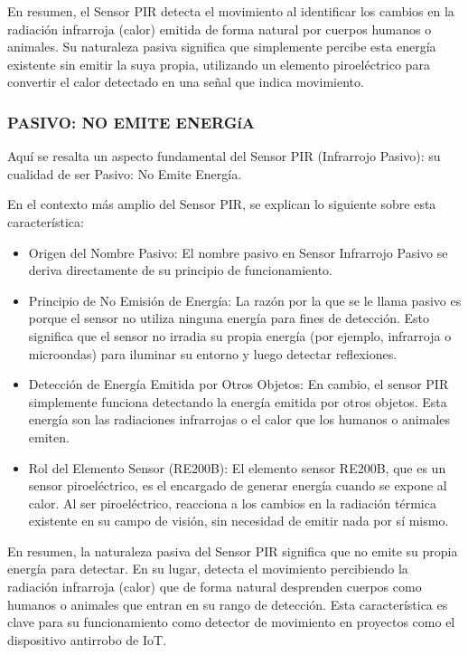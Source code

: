 \documentclass{report}
\begin{document}
En resumen, el Sensor PIR detecta el movimiento al identificar los cambios en la radiación infrarroja (calor) emitida de forma natural por cuerpos humanos 
o animales. Su naturaleza pasiva significa que simplemente percibe esta energía existente sin emitir la suya propia, utilizando un elemento piroeléctrico 
para convertir el calor detectado en una señal que indica movimiento.

\subsubsection{PASIVO: NO EMITE ENERGíA}
Aquí se resalta un aspecto fundamental del Sensor PIR (Infrarrojo Pasivo): su cualidad de ser 
Pasivo: No Emite Energía.

En el contexto más amplio del Sensor PIR, se  explican lo siguiente sobre esta característica:
\begin{itemize}
    \item Origen del Nombre Pasivo: El nombre pasivo en Sensor Infrarrojo Pasivo se deriva directamente de su principio de funcionamiento.
    \item Principio de No Emisión de Energía: La razón por la que se le llama pasivo es porque el sensor no utiliza ninguna energía para fines de detección. 
    Esto significa que el sensor no irradia su propia energía (por ejemplo, infrarroja o microondas) para iluminar su entorno y luego detectar reflexiones.
    \item Detección de Energía Emitida por Otros Objetos: En cambio, el sensor PIR simplemente funciona detectando la energía emitida por otros objetos. 
    Esta energía son las radiaciones infrarrojas o el calor que los humanos o animales emiten.
    \item Rol del Elemento Sensor (RE200B): El elemento sensor RE200B, que es un sensor piroeléctrico, es el encargado de generar energía cuando se expone 
    al calor. Al ser piroeléctrico, reacciona a los cambios en la radiación térmica existente en su campo de visión, sin necesidad de emitir nada por sí mismo. 
\end{itemize}

En resumen, la naturaleza pasiva del Sensor PIR significa que no emite su propia energía para detectar. En su lugar, detecta el movimiento percibiendo 
la radiación infrarroja (calor) que de forma natural desprenden cuerpos como humanos o animales que entran en su rango de detección. 
Esta característica es clave para su funcionamiento como detector de movimiento en proyectos como el dispositivo antirrobo de IoT.
\end{document}
